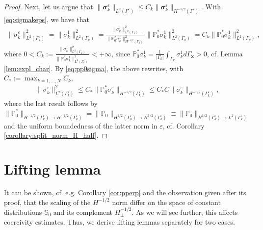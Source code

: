 \documentclass[]{article}
\numberwithin{equation}{section}
\numberwithin{theorem}{section}
\numberwithin{lemma}{section}
\numberwithin{corollary}{section}
\numberwithin{proposition}{section}
\numberwithin{definition}{section}
\newcommand{\bx}{\boldsymbol{x}}
\newcommand{\re}{\varepsilon}
\renewcommand{\vec}{\boldsymbol}
\begin{document}
\begin{appendices}
\begin{proof}
			Next, let us argue that $\|\vec{\sigma}_k^{\re}\|_{L^2(\Gamma^{\re})}\leq C_k\|\vec{\sigma}_k^{\re}\|_{H^{-1/2}(\Gamma^{\re})}$. With \eqref{eq:sigmakeps}, we have that   
			\begin{align*}
				\|{\sigma}_k^{\re}\|^2_{L^2(\Gamma^{\re}_k)}=\|{\sigma}_k^{1}\|^2_{L^2(\Gamma_k)}=\frac{\|{\sigma}_k^{1}\|^2_{L^2(\Gamma_k)}}{\|\mathbb{P}_0^*\sigma_k^1\|^2_{H^{-1/2}(\Gamma_k)}}\|\mathbb{P}_0^*\sigma_k^1\|^2_{L^2(\Gamma_k)}= C_k\|\mathbb{P}_0^*\sigma_k^1\|^2_{L^2(\Gamma_k)}, 
			\end{align*}
			where $0<C_k:=\frac{\|{\sigma}_k^{1}\|^2_{L^2(\Gamma_k)}}{\|\mathbb{P}_0^*\sigma_k^1\|^2_{L^2(\Gamma_k)}}<+\infty$, since $\mathbb{P}_0^*\sigma_k^1=\frac{1}{|\Gamma_k|}\int_{\Gamma_k}\sigma_k^1 d\Gamma_{\bx}> 0$, cf. Lemma \ref{lem:expl_char}. By  \eqref{eq:pp0sigma}, the above rewrites, with $C_*:=\max_{k=1, \ldots, N}C_k$, 
			\begin{align*}
				\|{\sigma}_k^{\re}\|^2_{L^2(\Gamma^{\re}_k)}\leq C_*\|\mathbb{P}_0^*\sigma^{\re}_k\|_{H^{-1/2}(\Gamma_k^{\re})}\leq C_*C\|\sigma^{\re}_k\|_{H^{-1/2}(\Gamma_k^{\re})},
			\end{align*}
			where the last result follows by $\|\mathbb{P}_0^*\|_{H^{-1/2}(\Gamma_k^{\re})\rightarrow H^{-1/2}(\Gamma_k^{\re})}=\|\mathbb{P}_0\|_{H^{1/2}(\Gamma_k^{\re})\rightarrow H^{1/2}(\Gamma_k^{\re})}\equiv \|\mathbb{P}_0\|_{H^{1/2}(\Gamma_k^{\re})\rightarrow L^2(\Gamma_k^{\re})}$ and the uniform boundedness of the latter norm in $\re$, cf. Corollary \ref{corollary:split_norm_H_half}.
		\end{proof}
		
		\section{Lifting lemma}
		\label{app:lifting_lemma}
		It can be shown, cf. e.g. Corollary \ref{cor:pperp} and the observation given after its proof, that the scaling of the $H^{-1/2}$ norm differ on the space of constant distributions $\mathbb{S}_0$ and its complement $H^{-1/2}_{\perp}$. As we will see further, this affects coercivity estimates. Thus, we derive lifting lemmas separately for two cases.
		
		

\end{appendices}
\end{document}
